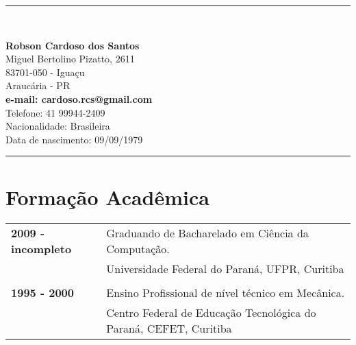 \documentclass[pdftex, a4paper, 11pt]{article}
\begin{document}
\vspace*{.3cm}
\begin{center}
  \rule{.8\textwidth}{1pt}\\[10pt]
  \begin{minipage}{.55\textwidth}
    \LARGE\textbf{Robson Cardoso dos Santos}\\[13pt]
    \small Miguel Bertolino Pizatto, 2611\\
    83701-050 - Iguaçu\\
    Araucária - PR\\[6pt]
    \textbf{e-mail: cardoso.rcs@gmail.com}\\
    Telefone: 41 99944-2409\\[6pt]
    \small Nacionalidade: Brasileira\\
    \small Data de nascimento: 09/09/1979\\
  \end{minipage}
  \rule{.8\textwidth}{1pt}
\end{center}
\vspace*{1cm}



\section*{Formação Acadêmica}
\begin{tabular}{ll}
  \textbf{2009 - incompleto} & Graduando de Bacharelado em Ciência da Computação.\\
  & Universidade Federal do Paraná, UFPR, Curitiba\\
  & \\
  \textbf{1995 - 2000} & Ensino Profissional de nível técnico em Mecânica.\\
  & Centro Federal de Educação Tecnológica do Paraná, CEFET, Curitiba\\
\end{tabular}
\end{document}
